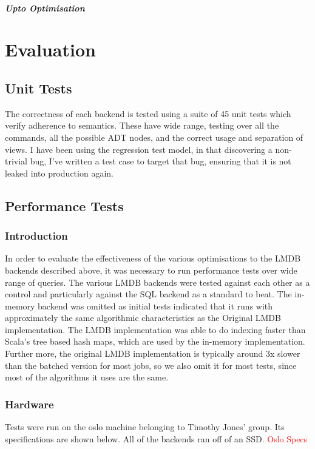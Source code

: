 \documentclass[12pt,a4paper,twoside,openright]{report}
\newcommand\todo[1]{\textcolor{red}{#1}}
\begin{document}
{		\paragraph{Upto Optimisation}



\chapter{Evaluation}
\section{Unit Tests}
The correctness of each backend is tested using a suite of 45 unit tests which verify adherence to semantics. These have  wide range, testing over all the commands, all the possible ADT nodes, and the correct usage and separation of views. I have been using the regression test model, in that discovering a non-trivial bug, I’ve written a test case to target that bug, ensuring that it is not leaked into production again.
\section{Performance Tests}
	\subsection{Introduction}
	In order to evaluate the effectiveness of the various optimisations to the LMDB backends described above, it was necessary to run performance tests over wide range of queries. The various LMDB backends were tested against each other as a control and particularly against the SQL backend as a standard to beat. The in-memory backend was omitted as initial tests indicated that it runs with approximately the same algorithmic characteristics as the Original LMDB implementation. The LMDB implementation was able to do indexing faster than Scala’s tree based hash maps, which are used by the in-memory implementation. Further more, the original LMDB implementation is typically around 3x slower than the batched version for most jobs, so we also omit it for most tests, since most of the algorithms it uses are the same.
	\subsection{Hardware}
	Tests were run on the oslo machine belonging to Timothy Jones’ group. Its specifications are shown below. All of the backends ran off of an SSD.
	\todo{Oslo Specs}
}
\end{document}
